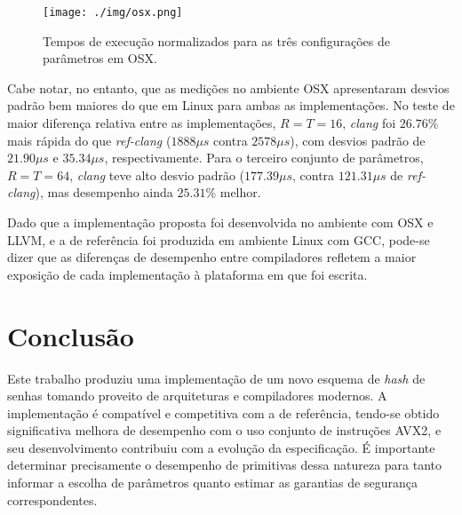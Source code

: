 \documentclass{article}
\begin{document}
\begin{figure}[htbp]
\centering
\texttt{[image: ./img/osx.png]}
\caption{Tempos de execução normalizados para as três configurações de
parâmetros em OSX\label{results-osx}.}
\end{figure}

Cabe notar, no entanto, que as medições no ambiente OSX apresentaram desvios
padrão bem maiores do que em Linux para ambas as implementações. No teste de
maior diferença relativa entre as implementações, $R = T = 16$, \emph{clang} foi
$26.76\%$ mais rápida do que \emph{ref-clang} ($1888 \mu s$ contra $2578 \mu
s$), com desvios padrão de $21.90 \mu s$ e $35.34 \mu s$, respectivamente. Para
o terceiro conjunto de parâmetros, $R = T = 64$, \emph{clang} teve alto desvio
padrão ($177.39 \mu s$, contra $121.31 \mu s$ de \emph{ref-clang}), mas
desempenho ainda $25.31\%$ melhor.

Dado que a implementação proposta foi desenvolvida no ambiente com OSX e
LLVM, e a de referência foi produzida em ambiente Linux com GCC,
pode-se dizer que as diferenças de desempenho entre compiladores
refletem a maior exposição de cada implementação à plataforma em que foi
escrita.

\section{Conclusão}

Este trabalho produziu uma implementação de um novo esquema de
\emph{hash} de senhas tomando proveito de arquiteturas e compiladores
modernos. A implementação é compatível e competitiva com a de
referência, tendo-se obtido significativa melhora de desempenho com o
uso conjunto de instruções AVX2, e seu desenvolvimento contribuiu com a
evolução da especificação.
É importante determinar precisamente o desempenho de primitivas dessa natureza para tanto informar a escolha de parâmetros
quanto estimar as garantias de segurança correspondentes.



\end{document}
